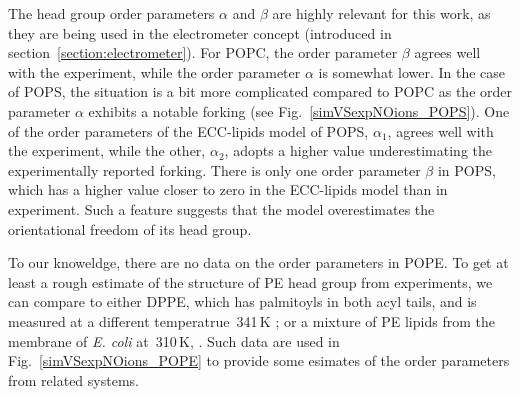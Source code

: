 The head group order parameters $\alpha$ and $\beta$ are highly relevant for this work,
as they are being used in the electrometer concept (introduced in section~\ref{section:electrometer}). 
For POPC, the order parameter $\beta$ agrees well with the experiment, 
while the order parameter $\alpha$ is somewhat lower. 
In the case of POPS, the situation is a bit more complicated
compared to POPC as the order parameter $\alpha$ exhibits a notable forking (see Fig.~\ref{simVSexpNOions_POPS}).
One of the order parameters of the ECC-lipids model of POPS, $\alpha_1$, agrees well with the experiment, 
while the other, $\alpha_2$, adopts a higher value underestimating the experimentally reported forking. 
There is only one order parameter $\beta$ in POPS, 
which has a higher value closer to zero in the ECC-lipids model than in experiment. 
Such a feature suggests that the model overestimates the orientational freedom of its head group. 

To our knoweldge, there are no data on the order parameters in POPE. 
To get at least a rough estimate of the structure of PE head group from experiments, 
we can compare to either DPPE, which has palmitoyls in both acyl tails, and is measured at a different temperatrue~341\,K \citep{seelig76, seelig80};
or a mixture of PE lipids from the membrane of \emph{E. coli} at~310\,K, \citep{gally81}. 
Such data are used in Fig.~\ref{simVSexpNOions_POPE} to provide some esimates of the order parameters from related systems. 
 
 
 
